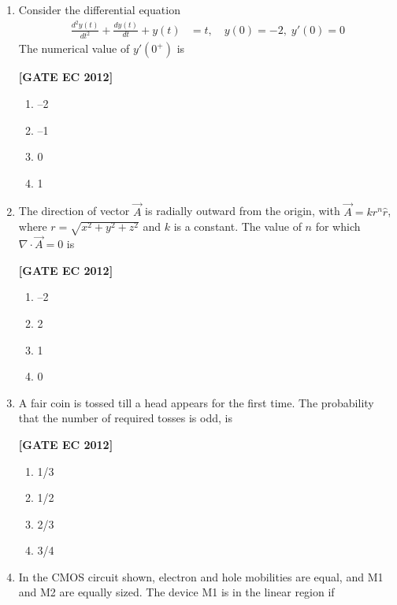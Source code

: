 \documentclass[12pt]{article}
\begin{document}
\begin{enumerate}[leftmargin=1.0em, label=\textbf{Q.\arabic*.}, itemsep=2em]
\begin{enumerate}[leftmargin=2.5em, label=\textbf{Q.\arabic*.}, itemsep=2em, start=26]
\item Consider the differential equation
\begin{align*}
\frac{d^2y(t)}{dt^2} + \frac{dy(t)}{dt} + y(t) &= t, \quad y(0)=-2, \; y'(0)=0
\end{align*}
The numerical value of $y'(0^+)$ is

\noindent \textbf{[GATE EC 2012]}
\begin{multicols}{2}
    \begin{enumerate}
        \item –2
        \item –1
        \item 0
        \item 1
    \end{enumerate}
\end{multicols}

\item The direction of vector $\vec{A}$ is radially outward from the origin, with $\vec{A} = k r^n \hat{r}$, where $r = \sqrt{x^2+y^2+z^2}$ and $k$ is a constant. The value of $n$ for which $\nabla \cdot \vec{A} = 0$ is

\noindent \textbf{[GATE EC 2012]}
\begin{multicols}{2}
    \begin{enumerate}
        \item –2
        \item 2
        \item 1
        \item 0
    \end{enumerate}
\end{multicols}

\item A fair coin is tossed till a head appears for the first time. The probability that the number of required tosses is odd, is

\noindent \textbf{[GATE EC 2012]}
\begin{multicols}{2}
    \begin{enumerate}
        \item 1/3
        \item 1/2
        \item 2/3
        \item 3/4
    \end{enumerate}
\end{multicols}

\item In the CMOS circuit shown, electron and hole mobilities are equal, and M1 and M2 are equally sized. The device M1 is in the linear region if


\end{enumerate}
\end{enumerate}
\end{document}
